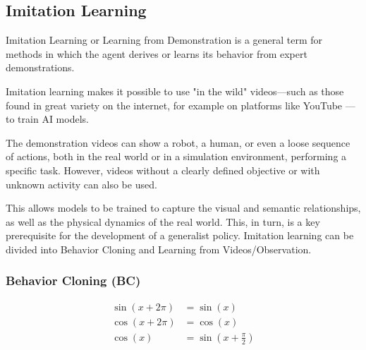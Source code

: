 \subsection{Imitation Learning}
Imitation Learning or Learning from Demonstration is a general term for methods in which the agent derives or learns its behavior from expert demonstrations.

Imitation learning makes it possible to use "in the wild" videos—such as those found in great variety on the internet, for example on platforms like YouTube — to train AI models.

The demonstration videos can show a robot, a human, or even a loose sequence of actions, both in the real world or in a simulation environment, performing a specific task. However, videos without a clearly defined objective or with unknown activity can also be used.

This allows models to be trained to capture the visual and semantic relationships, as well as the physical dynamics of the real world. This, in turn, is a key prerequisite for the development of a generalist policy.
Imitation learning can be divided into Behavior Cloning and Learning from Videos/Observation.

\subsubsection{Behavior Cloning (BC)}

\begin{align}
	\sin(x+2\pi) &= \sin(x)\\
	\cos(x+2\pi) &= \cos(x)\\
	\cos(x) &= \sin\left(x+\frac{\pi}{2}\right)
\end{align}

